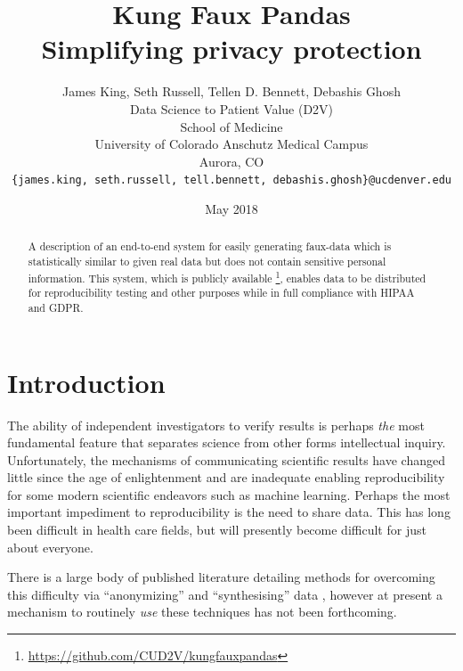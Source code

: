 \documentclass{article}
\title{%
  Kung Faux Pandas \\
  \large Simplifying privacy protection
  }
\author{
  James King, Seth Russell, Tellen D. Bennett, Debashis Ghosh\\
  Data Science to Patient Value (D2V)\\
  School of Medicine\\
  University of Colorado Anschutz Medical Campus\\
  Aurora, CO\\
  \texttt{\{james.king, seth.russell, tell.bennett, debashis.ghosh\}@ucdenver.edu}
  }
\date{May 2018}
\begin{document}

\maketitle

\begin{abstract}
A description of an end-to-end system for easily generating faux-data which is statistically similar to given real data but does not contain sensitive personal information.  This system, which is publicly available \footnote{\url{https://github.com/CUD2V/kungfauxpandas}}, enables data to be distributed for reproducibility testing and other purposes while in full compliance with HIPAA and GDPR.
\end{abstract}


\section{Introduction}


The ability of independent investigators to verify results is perhaps \emph{the} most fundamental feature that separates science from other forms intellectual inquiry.  Unfortunately, the mechanisms of communicating scientific results have changed little since the age of enlightenment and are inadequate enabling reproducibility for some modern scientific endeavors such as machine learning.  Perhaps the most important impediment to reproducibility is the need to share data.  This has long been difficult in health care fields, but will presently become difficult for just about everyone.

There is a large body of published literature detailing methods for overcoming this difficulty via ``anonymizing'' and ``synthesising'' data \cite{patki_synthetic_2016, choi_generating_2017}, however at present a mechanism to routinely \emph{use} these techniques has not been forthcoming.
\end{document}

